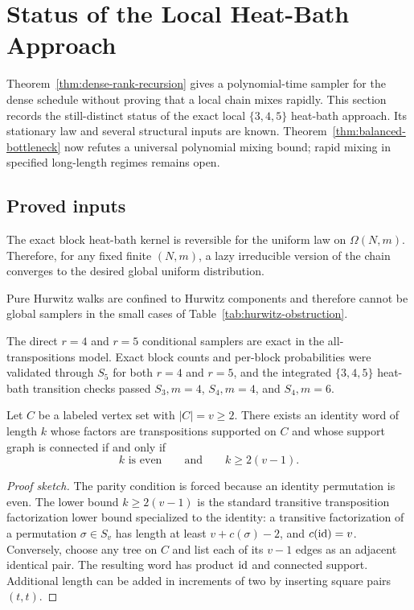 \section{Status of the Local Heat-Bath Approach}

Theorem~\ref{thm:dense-rank-recursion} gives a polynomial-time sampler for the
dense schedule without proving that a local chain mixes rapidly.  This section
records the still-distinct status of the exact local
$\{3,4,5\}$ heat-bath approach.  Its stationary law and several structural
inputs are known. Theorem~\ref{thm:balanced-bottleneck} now refutes a
universal polynomial mixing bound; rapid mixing in specified long-length
regimes remains open.

\subsection{Proved inputs}

The exact block heat-bath kernel is reversible for the uniform law on
$\Omega(N,m)$.  Therefore, for any fixed finite $(N,m)$, a lazy irreducible
version of the chain converges to the desired global uniform distribution.

Pure Hurwitz walks are confined to Hurwitz components and therefore cannot be
global samplers in the small cases of Table~\ref{tab:hurwitz-obstruction}.

The direct $r=4$ and $r=5$ conditional samplers are exact in the
all-transpositions model.  Exact block counts and per-block probabilities were
validated through $S_5$ for both $r=4$ and $r=5$, and the integrated
$\{3,4,5\}$ heat-bath transition checks passed $S_3,m=4$, $S_4,m=4$, and
$S_4,m=6$.

\begin{lemma}
Let $C$ be a labeled vertex set with $|C|=v\ge 2$.  There exists an identity
word of length $k$ whose factors are transpositions supported on $C$ and whose
support graph is connected if and only if
\[
  k \text{ is even}\qquad\text{and}\qquad k\ge 2(v-1).
\]
\end{lemma}

\begin{proof}[Proof sketch]
The parity condition is forced because an identity permutation is even.  The
lower bound $k\ge 2(v-1)$ is the standard transitive transposition
factorization lower bound specialized to the identity: a transitive
factorization of a permutation $\sigma\in S_v$ has length at least
$v+c(\sigma)-2$, and $c(\mathrm{id})=v$.  Conversely, choose any tree on $C$ and list
each of its $v-1$ edges as an adjacent identical pair.  The resulting word has product $\mathrm{id}$ and
connected support.  Additional length can be added in increments of two by
inserting square pairs $(t,t)$.
\end{proof}

